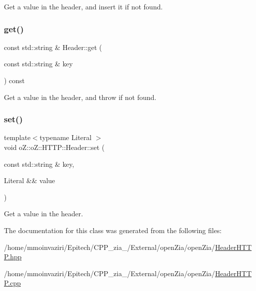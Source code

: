 Get a value in the header, and insert it if not found. 

\mbox{\label{classo_z_1_1o_z_1_1_h_t_t_p_1_1_header_acb0cba9e469ca227411584a4d5485b91}} 
\subsubsection{\texorpdfstring{get()}{get()}\hspace{0.1cm}{\footnotesize\ttfamily [2/2]}}
{\footnotesize\ttfamily const std\+::string \& Header\+::get (\begin{DoxyParamCaption}\item[{const std\+::string \&}]{key }\end{DoxyParamCaption}) const}



Get a value in the header, and throw if not found. 

\mbox{\label{classo_z_1_1o_z_1_1_h_t_t_p_1_1_header_ae42db1a4bb2515ca7474f3439d7e6804}} 
\subsubsection{\texorpdfstring{set()}{set()}}
{\footnotesize\ttfamily template$<$typename Literal $>$ \\
void o\+Z\+::o\+Z\+::\+H\+T\+T\+P\+::\+Header\+::set (\begin{DoxyParamCaption}\item[{const std\+::string \&}]{key,  }\item[{Literal \&\&}]{value }\end{DoxyParamCaption})\hspace{0.3cm}{\ttfamily [inline]}}



Get a value in the header. 



The documentation for this class was generated from the following files\+:\begin{DoxyCompactItemize}
\item 
/home/mmoinvaziri/\+Epitech/\+C\+P\+P\+\_\+zia\+\_/\+External/open\+Zia/open\+Zia/\mbox{\hyperlink{_header_h_t_t_p_8hpp}{Header\+H\+T\+T\+P.\+hpp}}\item 
/home/mmoinvaziri/\+Epitech/\+C\+P\+P\+\_\+zia\+\_/\+External/open\+Zia/open\+Zia/\mbox{\hyperlink{_header_h_t_t_p_8cpp}{Header\+H\+T\+T\+P.\+cpp}}\end{DoxyCompactItemize}
